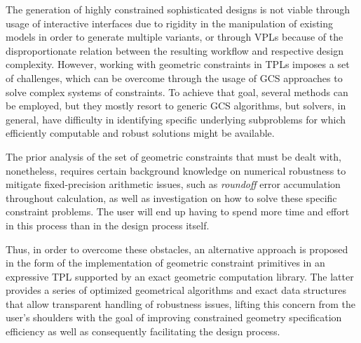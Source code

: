 %
\label{chap:conclusion}
\cleardoublepage{}

\noindent
The generation of highly constrained sophisticated designs is not viable through
usage of interactive interfaces due to rigidity in the manipulation of existing
models in order to generate multiple variants, or through \acp{VPL} because of
the disproportionate relation between the resulting workflow and respective
design complexity.  However, working with geometric constraints in \acp{TPL}
imposes a set of challenges, which can be overcome through the usage of \ac{GCS}
approaches to solve complex systems of constraints.  To achieve that goal,
several methods can be employed, but they mostly resort to generic \acs{GCS}
algorithms, but solvers, in general, have difficulty in identifying specific
underlying subproblems for which efficiently computable and robust solutions
might be available.

The prior analysis of the set of geometric constraints that must be dealt with,
nonetheless, requires certain background knowledge on numerical robustness to
mitigate fixed-precision arithmetic issues, such as \textit{roundoff} error
accumulation throughout calculation, as well as investigation on how to solve
these specific constraint problems.  The user will end up having to spend more
time and effort in this process than in the design process itself.

Thus, in order to overcome these obstacles, an alternative approach is proposed
in the form of the implementation of geometric constraint primitives in an
expressive \ac{TPL} supported by an exact geometric computation library.  The
latter provides a series of optimized geometrical algorithms and exact data
structures that allow transparent handling of robustness issues, lifting this
concern from the user's shoulders with the goal of improving constrained
geometry specification efficiency as well as consequently facilitating the
design process.
